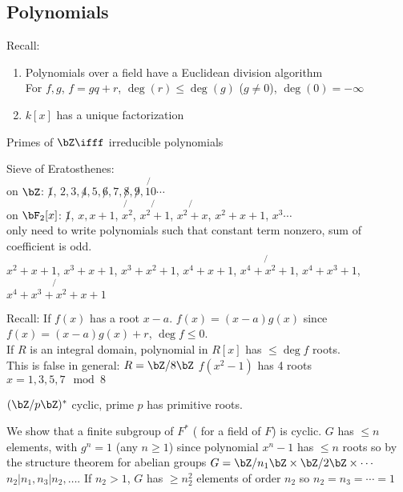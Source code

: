 
\subsection{Polynomials}

Recall: 
\begin{enumerate}
    \item Polynomials over a field have a Euclidean division algorithm \\ 
    For $f,g$, $f = gq+r$, $\deg (r) \le \deg (g)$ ($g \neq 0$), $\deg(0) = - \infty$ 
    \item $k[x]$ has a unique factorization
\end{enumerate}

\noindent
Primes of $\bZ \ifff $ irreducible polynomials 

\begin{example}
    Sieve of Eratosthenes: \\
    on $\bZ$: $\not1$, $\boxed{2}, \boxed{3}, \not4, \boxed{5}, \not6, \boxed{7}, \not8, \not9, \not{10} \cdots$ \\
    on $\bF_2[x]$: $\not1$, $\boxed{x}, \boxed{x+1}$, $\not{x^2}$, $\not{x^2+1}$, $\not{x^2+x}$, $\boxed{x^2+x+1}$, $x^3 \cdots$ \\
    only need to write polynomials such that constant term nonzero, sum of coefficient is odd. \\
    $\boxed{x^2+x+1}$, $\boxed{x^3+x+1}$, $\boxed{x^3+x^2+1}$, $\boxed{x^4+x+1}$, $\not{x^4+x^2+1}$, $\boxed{x^4+x^3+1}$, $\not{x^4+x^3+x^2+x+1}$ 
\end{example}

\noindent
Recall: If $f(x)$ has a root $x-a$. $f(x) = (x-a)g(x)$ since $f(x) = (x-a)g(x) + r$, $\deg f \le 0$.\\
 If $R$ is an integral domain, polynomial in $R[x]$ has $\le \deg f$ roots. \\
 This is false in general: $R = \bZ/8\bZ$ $f(x^2-1)$ has 4 roots $x=1,3,5,7 \mod 8$ \\

 \begin{corollary}
    $(\bZ/p\bZ)^{*}$ cyclic, prime $p$ has primitive roots. 
 \end{corollary}

 \begin{pf}
    We show that a finite subgroup of $F^*$ ( for a field of $F$) is cyclic. $G$ has $\le n$ elements, with $g^n=1$ (any $n \ge 1$) since polynomial $x^n-1$ has $\le n$ roots so by the structure theorem for abelian groups $G = \bZ/n_1\bZ \times \bZ/2\bZ \times \cdots$ $n_2|n_1, n_3|n_2, \ldots$. If $n_2 >1$, $G$ has $\ge n_2^2$ elements of order $n_2$ so $n_2 = n_3 = \cdots = 1$ 
 \end{pf}   

